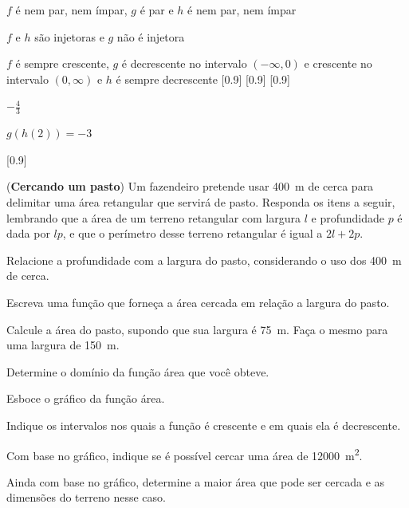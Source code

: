 \begin{exercises*}
\begin{exercise}
  \begin{answer}
    \begin{alphalist}
      \item $f$ é nem par, nem ímpar, $g$ é par e $h$ é nem par, nem ímpar
      \item $f$ e $h$ são injetoras e $g$ não é injetora
      \item $f$ é sempre crescente, $g$ é decrescente no intervalo $(-\infty, 0)$
            e crescente no intervalo $(0, \infty)$ e $h$ é sempre decrescente
            [0.9]
            [0.9]
            [0.9]
      \item $-\frac{4}{3}$
      \item $g(h(2))=-3$
      \item {}[0.9]
    \end{alphalist}
  \end{answer}
\end{exercise}

\begin{exercise}
  (\textbf{Cercando um pasto}) Um fazendeiro pretende usar \SI{400}{\meter}
  de cerca para delimitar uma área retangular que servirá de pasto.
  Responda os itens a seguir, lembrando que a área de um terreno retangular
  com largura $l$ e profundidade $p$ é dada por $lp$,
  e que o perímetro desse terreno retangular é igual a $2l+2p$.
  \begin{alphalist}
    \item Relacione a profundidade com a largura do pasto, considerando o uso
          dos \SI{400}{\meter} de cerca.
    \item Escreva uma função que forneça a área cercada em relação a largura
          do pasto.
    \item Calcule a área do pasto, supondo que sua largura é \SI{75}{\meter}.
          Faça o mesmo para uma largura de \SI{150}{\meter}.
    \item Determine o domínio da função área que você obteve.
    \item Esboce o gráfico da função área.
    \item Indique os intervalos nos quais a função é crescente e em quais
          ela é decrescente.
    \item Com base no gráfico, indique se é possível cercar uma área de
          \SI{12000}{\meter^2}.
    \item Ainda com base no gráfico, determine a maior área que pode ser
          cercada e as dimensões do terreno nesse caso.
  \end{alphalist}


\end{exercise}
\end{exercises*}
